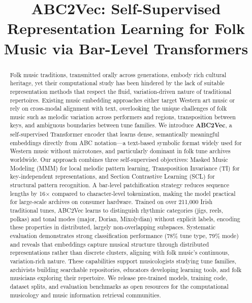 \documentclass[]{interact}
\theoremstyle{plain}
\theoremstyle{definition}
\theoremstyle{remark}
\begin{document}

\title{ABC2Vec: Self-Supervised Representation Learning for Folk Music via Bar-Level Transformers}


\author{
}


\maketitle

\begin{abstract}
Folk music traditions, transmitted orally across generations, embody rich cultural heritage, yet their computational study has been hindered by the lack of suitable representation methods that respect the fluid, variation-driven nature of traditional repertoires. Existing music embedding approaches either target Western art music or rely on cross-modal alignment with text, overlooking the unique challenges of folk music such as melodic variation across performers and regions, transposition between keys, and ambiguous boundaries between tune families. We introduce \textbf{ABC2Vec}, a self-supervised Transformer encoder that learns dense, semantically meaningful embeddings directly from ABC notation---a text-based symbolic format widely used for Western music without microtones, and particularly dominant in folk tune archives worldwide. Our approach combines three self-supervised objectives: Masked Music Modeling (MMM) for local melodic pattern learning, Transposition Invariance (TI) for key-independent representations, and Section Contrastive Learning (SCL) for structural pattern recognition. A bar-level patchification strategy reduces sequence lengths by 16$\times$ compared to character-level tokenization, making the model practical for large-scale archives on consumer hardware. Trained on over 211,000 Irish traditional tunes, ABC2Vec learns to distinguish rhythmic categories (jigs, reels, polkas) and tonal modes (major, Dorian, Mixolydian) without explicit labels, encoding these properties in distributed, largely non-overlapping subspaces. Systematic evaluation demonstrates strong classification performance (78\% tune type, 79\% mode) and reveals that embeddings capture musical structure through distributed representations rather than discrete clusters, aligning with folk music's continuous, variation-rich nature. These capabilities support musicologists studying tune families, archivists building searchable repositories, educators developing learning tools, and folk musicians exploring their repertoire. We release pre-trained models, training code, dataset splits, and evaluation benchmarks as open resources for the computational musicology and music information retrieval communities.
\end{abstract}
\end{document}
